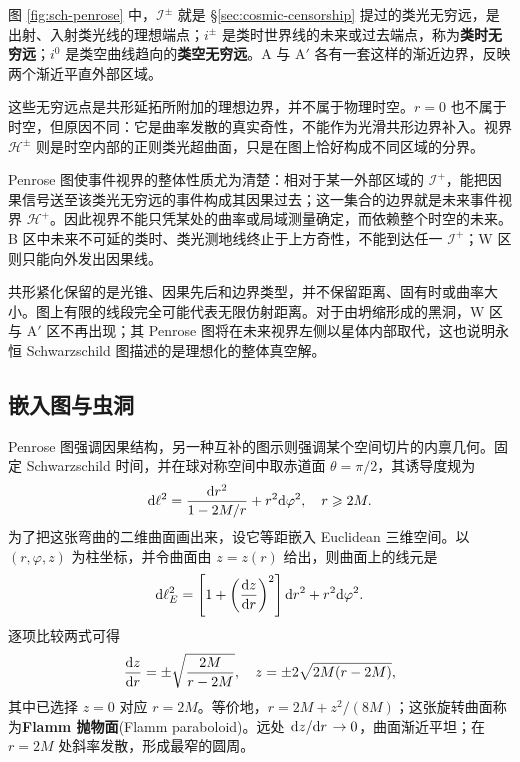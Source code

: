图 \ref{fig:sch-penrose} 中，$\mathscr I^\pm$ 就是 \S\ref{sec:cosmic-censorship} 提过的类光无穷远，是出射、入射类光线的理想端点；$i^\pm$ 是类时世界线的未来或过去端点，称为\textbf{类时无穷远}；$i^0$ 是类空曲线趋向的\textbf{类空无穷远}。A 与 A$'$ 各有一套这样的渐近边界，反映两个渐近平直外部区域。

这些无穷远点是共形延拓所附加的理想边界，并不属于物理时空。$r=0$ 也不属于时空，但原因不同：它是曲率发散的真实奇性，不能作为光滑共形边界补入。视界 $\mathcal H^\pm$ 则是时空内部的正则类光超曲面，只是在图上恰好构成不同区域的分界。

Penrose 图使事件视界的整体性质尤为清楚：相对于某一外部区域的 $\mathscr I^+$，能把因果信号送至该类光无穷远的事件构成其因果过去；这一集合的边界就是未来事件视界 $\mathcal H^+$。因此视界不能只凭某处的曲率或局域测量确定，而依赖整个时空的未来。B 区中未来不可延的类时、类光测地线终止于上方奇性，不能到达任一 $\mathscr I^+$；W 区则只能向外发出因果线。

共形紧化保留的是光锥、因果先后和边界类型，并不保留距离、固有时或曲率大小。图上有限的线段完全可能代表无限仿射距离。对于由坍缩形成的黑洞，W 区与 A$'$ 区不再出现；其 Penrose 图将在未来视界左侧以星体内部取代，这也说明永恒 Schwarzschild 图描述的是理想化的整体真空解。

\subsection{嵌入图与虫洞}

Penrose 图强调因果结构，另一种互补的图示则强调某个空间切片的内禀几何。固定 Schwarzschild 时间，并在球对称空间中取赤道面 $\theta=\pi/2$，其诱导度规为
\[
    \dd \ell^2=\frac{\dd r^2}{1-2M/r}+r^2\dd\varphi^2,
    \quad r\geqslant 2M.
\]
为了把这张弯曲的二维曲面画出来，设它等距嵌入 Euclidean 三维空间。以 $(r,\varphi,z)$ 为柱坐标，并令曲面由 $z=z(r)$ 给出，则曲面上的线元是
\[
    \dd \ell_E^2=\left[1+\left(\dv{z}{r}\right)^2\right]\dd r^2+r^2\dd\varphi^2.
\]
逐项比较两式可得
\[
    \dv{z}{r}=\pm\sqrt{\frac{2M}{r-2M}},\quad
    z=\pm2\sqrt{2M(r-2M)},
\]
其中已选择 $z=0$ 对应 $r=2M$。等价地，$r=2M+z^2/(8M)$；这张旋转曲面称为\textbf{Flamm 抛物面}(Flamm paraboloid)。远处 $\dv*{z}{r}\to0$，曲面渐近平坦；在 $r=2M$ 处斜率发散，形成最窄的圆周。

